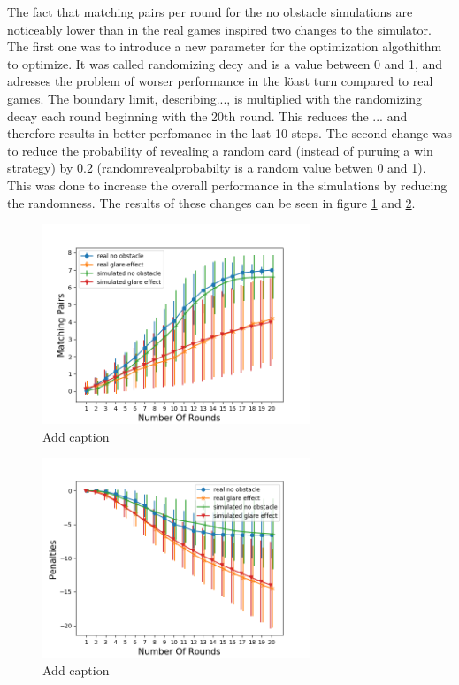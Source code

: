 The fact that matching pairs per round for the no obstacle simulations are noticeably lower than in the real games inspired two changes to the simulator. The first one was to introduce a new parameter for the optimization algothithm to optimize. It was called randomizing decy and is a value between 0 and 1, and adresses the problem of worser performance in the löast turn compared to real games. The boundary limit, describing..., is multiplied with the randomizing decay each round beginning with the 20th round. This reduces the ... and therefore results in better perfomance in the last 10 steps. The second change was to reduce the probability of revealing a random card (instead of puruing a win strategy) by 0.2 (randomrevealprobabilty is a random value betwen 0 and 1). This was done to increase the overall performance in the simulations by reducing the randomness. The results of these changes can be seen in figure \ref{fig:simOp1} and \ref{fig:simOp2}. 

\begin{minipage}{0.5\textwidth}
	\begin{figure}[H]
		\centering
		\includegraphics[width=8cm]{images/simulationOptimized1.png}
		\caption[Bild kurz]{Add caption}
		\label{fig:simOp1}
	\end{figure}
\end{minipage}
\begin{minipage}{0.5\textwidth}
	\begin{figure}[H]
		\centering
		\includegraphics[width=8cm]{images/simulationOptimized2.png}
		\caption[Bild kurz]{Add caption}
		\label{fig:simOp2}
	\end{figure}
\end{minipage} 


